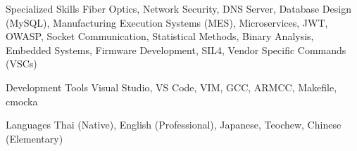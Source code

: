 \begin{cvskills}
  \cvskill
    {Specialized Skills} %
    {Fiber Optics, Network Security, DNS Server, Database Design (MySQL), Manufacturing Execution Systems (MES), Microservices, JWT, OWASP, Socket Communication, Statistical Methods, Binary Analysis, Embedded Systems, Firmware Development, SIL4, Vendor Specific Commands (VSCs)} %

  \cvskill
    {Development Tools} %
    {Visual Studio, VS Code, VIM, GCC, ARMCC, Makefile, cmocka} %

  \cvskill
    {Languages} %
    {Thai (Native), English (Professional), Japanese, Teochew, Chinese (Elementary)} %

\end{cvskills}
